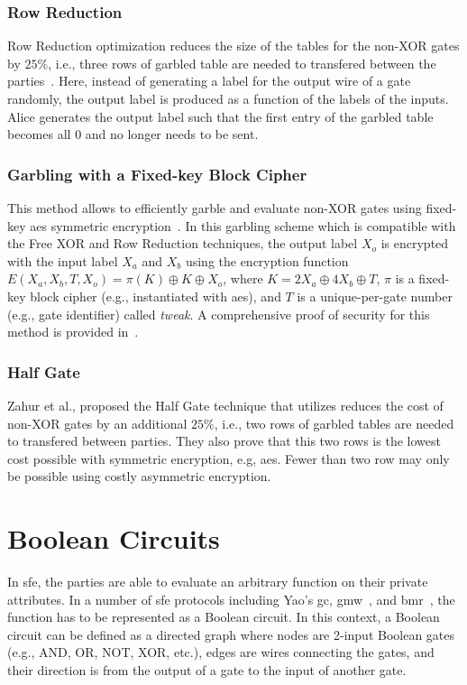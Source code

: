 \subsubsection{Row Reduction}\label{sssec:prelim-row}
Row Reduction optimization reduces the size of the tables for the non-XOR gates by $25\%$, i.e., three rows of garbled table are needed to transfered between the parties~\cite{naor1999privacy}.
Here, instead of generating a label for the output wire of a gate randomly, the output label is produced as a function of the labels of the inputs.
Alice generates the output label such that the first entry of the garbled table becomes all $0$ and no longer needs to be sent.

\subsubsection{Garbling with a Fixed-key Block Cipher}\label{sssec:prelim-aes}
This method allows to efficiently garble and evaluate non-XOR gates using fixed-key \acrfull{aes} symmetric encryption~\cite{bellare2013efficient}.
In this garbling scheme which is compatible with the Free XOR and Row Reduction techniques, the output label $X_{o}$ is encrypted with the input label $X_{a}$ and $X_{b}$ using the encryption function $E(X_a,X_b,T,X_o) = \pi(K) \oplus K \oplus X_o$, where $K=2X_a\oplus4X_b\oplus T$, $\pi$ is a fixed-key block cipher (e.g., instantiated with \acrshort{aes}), and $T$ is a unique-per-gate number (e.g., gate identifier) called \emph{tweak}.
A comprehensive proof of security for this method is provided in~\cite{bellare2013efficient}.

\subsubsection{Half Gate}\label{sssec:prelim-half}
Zahur et al., proposed the Half Gate technique that utilizes reduces the cost of non-XOR gates by an additional $25\%$, i.e., two rows of garbled tables are needed to transfered between parties\cite{zahur2015two}.
They also prove that this two rows is the lowest cost possible with symmetric encryption, e.g, \acrshort{aes}.
Fewer than two row may only be possible using costly asymmetric encryption.

\section{Boolean Circuits}\label{sec:prelim-circuit}
In \acrshort{sfe}, the parties are able to evaluate an arbitrary function on their private attributes.
In a number of \acrshort{sfe} protocols including Yao's \acrshort{gc}, \acrfull{gmw}~\cite{goldreich1987play}, and \acrfull{bmr}~\cite{beaver1990round}, the function has to be represented as a Boolean circuit.
In this context, a Boolean circuit can be defined as a directed graph where nodes are 2-input Boolean gates (e.g., AND, OR, NOT, XOR, etc.), edges are wires connecting the gates, and their direction is from the output of a gate to the input of another gate.


